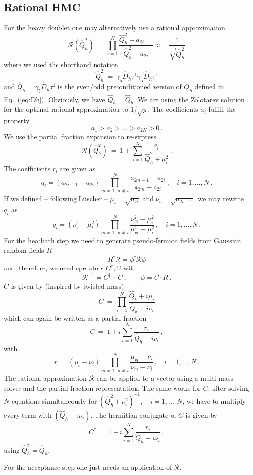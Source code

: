 \subsection{Rational HMC}

For the heavy doublet one may alternatively use a rational
approximation 
\[
\mathcal{R}(\hat Q_h^2)\ = \ \prod_{i = 1}^N \frac{\hat Q_h^2 +
  a_{2i-1}}{\hat Q_h^2 + a_{2i}}\approx\quad\frac{1}{\sqrt{\hat Q_h^2}}
\]
where we used the shorthand notation
\[
\hat Q_h^2\ =\ \gamma_5 \hat D_h \tau^1\gamma_5\hat D_h \tau^1 
\]
and $\hat Q_h=\gamma_5\hat D_h\tau^1$ is the even/odd preconditioned version
of $Q_h$ defined in Eq.~(\ref{eq:Dh}). Obviously, we have $\hat
Q_h^\dagger = \hat Q_h$. 
We are using the Zolotarev solution for the
optimal rational approximation to $1/\sqrt{y}$. The coefficients $a_i$
fulfill the property
\[
a_1 > a_2 > ... > a_{2N} > 0\, .
\]
We use the partial fraction expansion to re-express
\[
\mathcal{R}(\hat Q_h^2)\ = \ 1 + \sum_{i=1}^{N} \frac{q_i}{\hat Q_h^2 +
  \mu_i^2}\, .
\]
The coefficients $r_i$ are given as
\[
q_i = (a_{2i-1} - a_{2i}) \prod_{m=1, m\neq i}^N \frac{a_{2m-1}
  - a_{2i}}{a_{2m} - a_{2i}}\,,\quad i = 1,...,N\,.
\]
If we defined -- following L{\"u}scher -- $\mu_i = \sqrt{a_{2i}}$ and $\nu_i
= \sqrt{a_{2i-1}}$, we may rewrite $q_i$ as
\[
q_i = (\nu_i^2 - \mu_i^2)\prod_{m=1, m\neq i}^N \frac{\nu_m^2 -
  \mu_i^2}{\mu_m^2 - \mu_i^2}\,,\quad i = 1,...,N\, .
\]
For the heatbath step we need to generate pseudo-fermion fields from
Gaussian random fields $R$
\[
R^\dagger R = \phi^\dagger \mathcal{R} \phi
\]
and, therefore, we need operators $C^\dagger, C$ with
\[
\mathcal{R}^{-1} = C^\dagger\ \cdot\ C\,,\qquad \phi = C\cdot R\,.
\]
$C$ is given by (inspired by twisted mass)
\[
C\ =\ \prod_{i=1}^N \frac{\hat Q_h + i\mu_i}{\hat Q_h + i\nu_i}
\]
which can again be written as a partial fraction
\[
C\ =\ 1 + i\sum_{i=1}^N \frac{r_i}{\hat Q_h + i\nu_i}\,,
\]
with
\[
r_i = (\mu_i - \nu_i)\prod_{m=1, m\neq i}^N \frac{\mu_m -
  \nu_i}{\nu_m - \nu_i}\,,\quad i = 1,...,N\, .
\]
The rational approximation $\mathcal{R}$ can be applied to a vector
using a multi-mass solver and the partial fraction representation. The
same works for $C$: after solving $N$ equations simultaneously for
$(\hat Q_h^2 + \nu_i^2)^{-1},\quad i = 1,...,N$, we have to multiply
every term with $(\hat Q_h - i\nu_i)$. The hermitian conjugate of $C$
is given by
\[
C^\dagger\ =\ 1 - i\sum_{i=1}^N \frac{r_i}{\hat Q_h - i\nu_i}\,,
\]
using $\hat Q_h^\dagger = \hat Q_h$.

For the acceptance step one just needs an application of $\mathcal{R}$.

